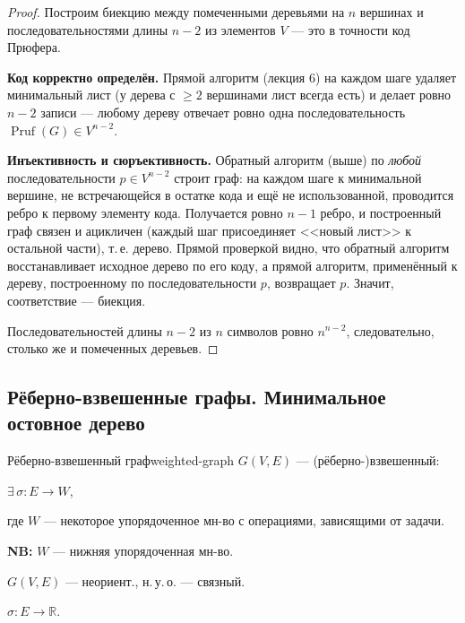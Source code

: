\begin{proof}
Построим биекцию между помеченными деревьями на $n$ вершинах и
последовательностями длины $n - 2$ из элементов $V$ --- это в точности
код Прюфера.

\textbf{Код корректно определён.} Прямой алгоритм (лекция 6) на каждом
шаге удаляет минимальный лист (у дерева с $\ge 2$ вершинами лист всегда
есть) и делает ровно $n - 2$ записи --- любому дереву отвечает ровно одна
последовательность $\operatorname{Pruf}(G) \in V^{n-2}$.

\textbf{Инъективность и сюръективность.} Обратный алгоритм (выше) по
\emph{любой} последовательности $p \in V^{n-2}$ строит граф: на каждом
шаге к минимальной вершине, не встречающейся в остатке кода и ещё не
использованной, проводится ребро к первому элементу кода. Получается
ровно $n - 1$ ребро, и построенный граф связен и ацикличен (каждый шаг
присоединяет <<новый лист>> к остальной части), т.\,е. дерево. Прямой
проверкой видно, что обратный алгоритм восстанавливает исходное дерево
по его коду, а прямой алгоритм, применённый к дереву, построенному по
последовательности $p$, возвращает $p$. Значит, соответствие ---
биекция.

Последовательностей длины $n - 2$ из $n$ символов ровно $n^{n-2}$,
следовательно, столько же и помеченных деревьев.
\end{proof}


\subsection*{Рёберно-взвешенные графы. Минимальное остовное дерево}

\begin{defn}{Рёберно-взвешенный граф}{weighted-graph}
$G(V, E)$ --- (рёберно-)взвешенный:

$\exists\, \sigma\colon E \to W$,

где $W$ --- некоторое упорядоченное мн-во
с операциями, зависящими от задачи.

\textbf{NB:} $W$ --- нижняя упорядоченная мн-во.
\end{defn}

$G(V, E)$ --- неориент., н.\,у.\,о. --- связный.

$\sigma\colon E \to \mathbb{R}$.

